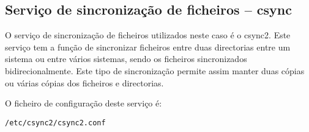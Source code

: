 \subsection{Serviço de sincronização de ficheiros – csync}

O serviço de sincronização de ficheiros utilizados neste caso é o csync2. Este serviço tem a função de sincronizar ficheiros entre duas directorias entre um sistema ou entre vários sistemas, sendo os ficheiros sincronizados bidirecionalmente. Este tipo de sincronização permite assim manter duas cópias ou várias cópias dos ficheiros e directorias.

O ficheiro de configuração deste serviço é:

\begin{Verbatim}[commandchars=\\\{\}]
/etc/csync2/csync2.conf
\end{Verbatim}


